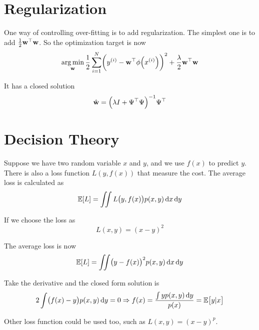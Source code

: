 \section{Regularization}

One way of controlling over-fitting is to add regularization. The simplest one is to add $\frac{1}{2} {\mathbf{w}}^\top\mathbf{w}$. So the optimization target is now
\begin{equation}
    \argmin{\feature{w}} \frac{1}{2} \sum_{i=1}^N \mleft( \selectonesample{y}{i} - \transpose{\feature{w}} \phi\mleft(\selectonesample{x}{i}\mright) \mright)^2 + \frac{\lambda}{2} \transpose{\feature{w}}\feature{w}
\end{equation}

It has a closed solution
\begin{equation}
    \estimation{\feature{w}} = \inverse{\mleft(\lambda I + \transpose{\Psi} \Psi\mright)} \transpose{\Psi} 
\end{equation}



\section{Decision Theory}

Suppose we have two random variable $x$ and $y$, and we use $f(x)$ to predict $y$. There is also a loss function $L(y, f(x))$ that measure the cost. The average loss is calculated as
\begin{equation}
    \expectation{L} = \iint L\mleft(y, f(x)\mright) p(x,y) \dif x \dif y
\end{equation}

If we choose the loss as
\begin{equation}\label{square_loss}
    L(x, y) = (x-y)^2
\end{equation}

The average loss is now
\begin{equation}
    \expectation{L} = \iint \mleft(y - f(x)\mright)^2 p(x,y) \dif x \dif y
\end{equation}

Take the derivative and the closed form solution is
\begin{equation}
    2 \int \mleft( f(x) -y \mright) p(x,y) \dif y = 0 \Rightarrow f(x) = \frac{\int y p(x,y) \dif y}{p(x)} = \expectation{y|x}
\end{equation}

Other loss function could be used too, such as  $L(x,y) = (x - y)^p$.


